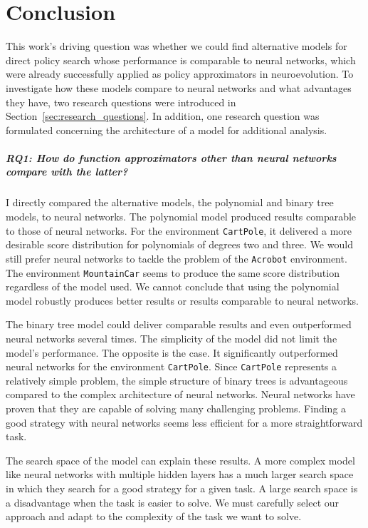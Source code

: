 
\chapter{Conclusion}
\label{ch:conclusions}

This work's driving question was whether we could find alternative models for direct policy search whose performance is comparable to neural networks, which were already successfully applied as policy approximators in neuroevolution. To investigate how these models compare to neural networks and what advantages they have, two research questions were introduced in Section~\ref{sec:research_questions}. In addition, one research question was formulated concerning the architecture of a model for additional analysis.

\paragraph*{RQ1: How do function approximators other than neural networks compare with the latter?} I directly compared the alternative models, the polynomial and binary tree models, to neural networks. The polynomial model produced results comparable to those of neural networks. For the environment \verb|CartPole|, it delivered a more desirable score distribution for polynomials of degrees two and three. We would still prefer neural networks to tackle the problem of the \verb|Acrobot| environment. The environment \verb|MountainCar| seems to produce the same score distribution regardless of the model used. We cannot conclude that using the polynomial model robustly produces better results or results comparable to neural networks.

The binary tree model could deliver comparable results and even outperformed neural networks several times. The simplicity of the model did not limit the model's performance. The opposite is the case. It significantly outperformed neural networks for the environment \verb|CartPole|. Since \verb|CartPole| represents a relatively simple problem, the simple structure of binary trees is advantageous compared to the complex architecture of neural networks. Neural networks have proven that they are capable of solving many challenging problems. Finding a good strategy with neural networks seems less efficient for a more straightforward task.

The search space of the model can explain these results. A more complex model like neural networks with multiple hidden layers has a much larger search space in which they search for a good strategy for a given task. A large search space is a disadvantage when the task is easier to solve. We must carefully select our approach and adapt to the complexity of the task we want to solve.

